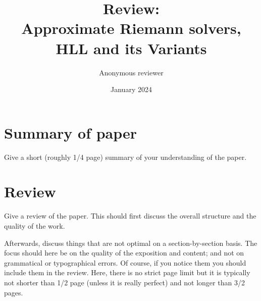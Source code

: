\documentclass{scrartcl}
\title{Review: \\Approximate Riemann solvers, HLL and its Variants}
\author{Anonymous reviewer} %
\date{January 2024}
\begin{document}
\maketitle

\section{Summary of paper}
Give a short (roughly 1/4 page) summary of your understanding of the paper.

\section{Review}
Give a review of the paper. This should first discuss the overall structure and the quality of the work.

Afterwards, discuss things that are not optimal on a section-by-section basis.
The focus should here be on the quality of the exposition and content; and not on grammatical or typographical errors.
Of course, if you notice them you should include them in the review.
Here, there is no strict page limit but it is typically not shorter than 1/2 page (unless it is really perfect) and not longer than 3/2 pages.
\end{document}
